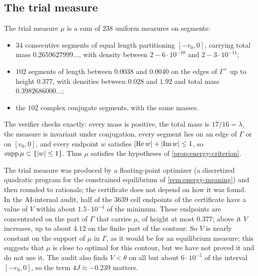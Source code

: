 \subsection{The trial measure}\label{subsec:trial-measure}

The trial measure $\mu$ is a sum of $238$ uniform measures on segments:
\begin{itemize}
  \item $34$ consecutive segments of equal length partitioning $[-r_0,0]$, carrying total mass
  $0.2659627999\ldots$, with density between $2-6\cdot10^{-10}$ and $2-3\cdot10^{-11}$;
  \item $102$ segments of length between $0.0038$ and $0.0040$ on the edges of $\Gamma^+$ up to
  height $0.377$, with densities between $0.028$ and $1.92$ and total mass
  $0.3982686000\ldots$;
  \item the $102$ complex conjugate segments, with the same masses.
\end{itemize}
The verifier checks exactly: every mass is positive, the total mass is $17/16=\lambda$, the
measure is invariant under conjugation, every segment lies on an edge of $\Gamma$ or on
$[v_0,0]$, and every endpoint $w$ satisfies $\lvert \operatorname{Re}w\rvert+\lvert \operatorname{Im}w\rvert\le1$,
so $\operatorname{supp}\mu\subset\{\lvert w\rvert\le1\}$. Thus $\mu$ satisfies the hypotheses of
\cref{prop:energy-criterion}.

The trial measure was produced by a floating-point optimizer (a discretized quadratic program for
the constrained equilibrium of \cref{rem:energy-meaning}) and then rounded to rationals; the
certificate does not depend on how it was found. In the AI-internal audit, half of the $3639$
cell endpoints of the certificate have a value of $V$ within about $1.5\cdot10^{-4}$ of the
minimum. These endpoints are concentrated on the part of $\Gamma$ that carries $\mu$, of height at
most $0.377$; above it $V$ increases, up to about $4.12$ on the finite part of the contour. So $V$
is nearly constant on the support of $\mu$ in $\Gamma$, as it would be for an equilibrium measure;
this suggests that $\mu$ is close to optimal for this contour, but we have not proved it and do
not use it. The audit also finds $V<\theta$ on all but about $6\cdot10^{-5}$ of the interval
$[-r_0,0]$, so the term $4J\approx-0.239$ matters.
